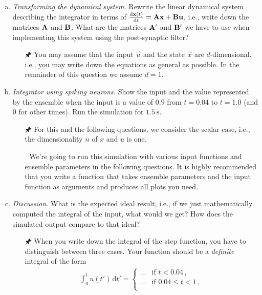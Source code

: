 	\begin{enumerate}[a)]
		\item {} \emph{Transforming the dynamical system.} Rewrite the linear dynamical system describing the integrator in terms of $\frac{\mathrm{d}{\mathbf{x}}(t)}{\mathrm{d}t} = {\mathbf{A}} {\mathbf{x}} + {\mathbf{B}} {\mathbf{u}}$, i.e., write down the matrices ${\mathbf{A}}$ and ${\mathbf{B}}$. What are the matrices ${\mathbf{A}}'$ and ${\mathbf{B}}'$ we have to use when implementing this system using the post-synaptic filter?
		\begin{itemize}
			\item[{\symbolfont 🖈}] You may assume that the input $\vec u$ and the state $\vec x$ are $d$-dimensional, i.e., you may write down the equations as general as possible. In the remainder of this question we assume $d = 1$.
		\end{itemize}
		\item {} \emph{Integrator using spiking neurons.} Show the input and the value represented by the ensemble when the input is a value of $0.9$ from $t=0.04$ to $t=1.0$ (and $0$ for other times). Run the simulation for $\SI{1.5}{\second}$.
		\begin{itemize}
			\item[{\symbolfont 🖈}] For this and the following questions, we consider the scalar case, i.e., the dimensionality $n$ of $x$ and $u$ is one.
			\item[{\symbolfont 🐍}] We're going to run this simulation with various input functions and ensemble parameters in the following questions. It is highly recommended that you write a function that takes ensemble parameters and the input function as arguments and produces all plots you need.
		\end{itemize}
		\item {} \emph{Discussion.} What is the expected ideal result, i.e., if we just mathematically computed the integral of the input, what would we get? How does the simulated output compare to that ideal?
		\begin{itemize}
			\item[{\symbolfont 🖈}] When you write down the integral of the step function, you have to distinguish between three cases. Your function should be a \emph{definite} integral of the form
			\begin{align*}
				\int_{0}^{t} u(t') \,\mathrm{d}{t'} = \begin{cases}
					\ldots & \text{if } t < 0.04 \,,\\
					\ldots & \text{if } 0.04 \leq t < 1 \,,\\

\end{cases}
\end{align*}
\end{itemize}
\end{enumerate}
